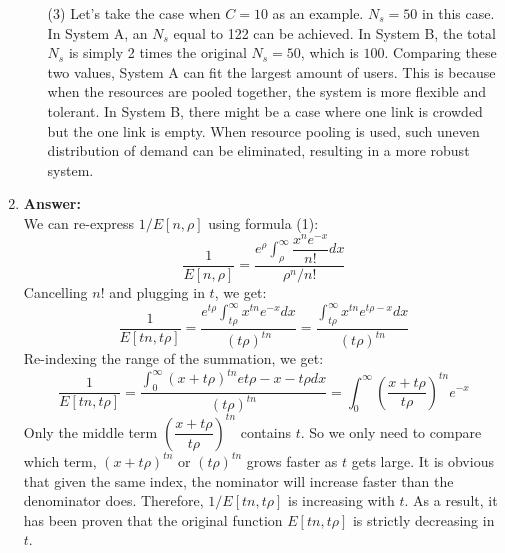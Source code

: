 \documentclass[12pt]{article}
\begin{document}
\begin{enumerate}
\begin{itemize}
\item[(3)]Let's take the case when $C=10$ as an example. $N_s=50$ in this case. 
\medskip\\
In System A, an $N_s$ equal to 122 can be achieved. In System B, the total $N_s$ is simply 2 times the original $N_s=50$, which is $100$. Comparing these two values, System A can fit the largest amount of users. This is because when the resources are pooled together, the system is more flexible and tolerant. In System B, there might be a case where one link is crowded but the one link is empty. When resource pooling is used, such uneven distribution of demand can be eliminated, resulting in a more robust system.
\end{itemize}
\item{} \textbf{Answer:}
\medskip\\
We can re-express $1/E[n,\rho]$ using formula (1):
$$\dfrac{1}{E[n,\rho]}=\dfrac{e^\rho\int_\rho^\infty\dfrac{x^ne^{-x}}{n!}dx}{\rho^n/n!}$$
Cancelling $n!$ and plugging in $t$, we get:
$$\dfrac{1}{E[tn,t\rho]}=\dfrac{e^{t\rho}\int_{t\rho}^\infty x^{tn}e^{-x}dx}{(t\rho)^{tn}}=\dfrac{\int_{t\rho}^\infty x^{tn}e^{t\rho-x}dx}{(t\rho)^{tn}}$$
Re-indexing the range of the summation, we get:
$$\dfrac{1}{E[tn,t\rho]}=\dfrac{\int_0^\infty(x+t\rho)^{tn}e{t\rho-x-t\rho}dx}{(t\rho)^{tn}}=\int_0^\infty(\dfrac{x+t\rho}{t\rho})^{tn}e^{-x}$$
Only the middle term $(\dfrac{x+t\rho}{t\rho})^{tn}$ contains $t$. So we only need to compare which term, $(x+t\rho)^{tn}$ or $(t\rho)^{tn}$ grows faster as $t$ gets large. It is obvious that given the same index, the nominator will increase faster than the denominator does. Therefore, $1/E[tn,t\rho]$ is increasing with $t$. As a result, it has been proven that the original function $E[tn,t\rho]$ is strictly decreasing in $t$.


\end{enumerate}
\end{document}
